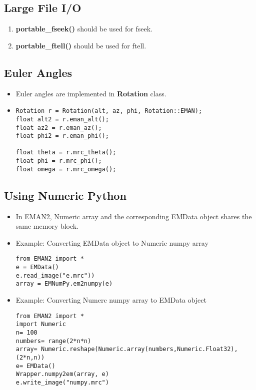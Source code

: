     \subsection{Large File I/O} 
    \begin{enumerate}
      \item 
	\textbf{portable\_fseek()} should be used for fseek.
      \item
	\textbf{portable\_ftell()} should be used for ftell.
    \end{enumerate}

    \subsection{Euler Angles} 
    \begin{itemize}
      \item
	Euler angles are implemented in \textbf{Rotation} class.
      \item
	{\color[named]{OliveGreen}
	\begin{verbatim}Rotation r = Rotation(alt, az, phi, Rotation::EMAN);
float alt2 = r.eman_alt();
float az2 = r.eman_az();
float phi2 = r.eman_phi();

float theta = r.mrc_theta();
float phi = r.mrc_phi();
float omega = r.mrc_omega();\end{verbatim}}
    \end{itemize}

    \subsection{Using Numeric Python} 
    \begin{itemize}
      \item
	In EMAN2,  Numeric array and the corresponding EMData object shares the same memory block.
      \item
	Example: Converting EMData object to Numeric numpy array
	{\color[named]{OliveGreen}
	\begin {verbatim}from EMAN2 import *
e = EMData()
e.read_image("e.mrc"))
array = EMNumPy.em2numpy(e)\end{verbatim}}
      \item
	Example: Converting Numerc numpy array to EMData object
	{\color[named]{OliveGreen}
	\begin{verbatim}from EMAN2 import *
import Numeric
n= 100
numbers= range(2*n*n)
array= Numeric.reshape(Numeric.array(numbers,Numeric.Float32),(2*n,n))
e= EMData()
Wrapper.numpy2em(array, e)
e.write_image("numpy.mrc")\end{verbatim}}
    \end{itemize}

